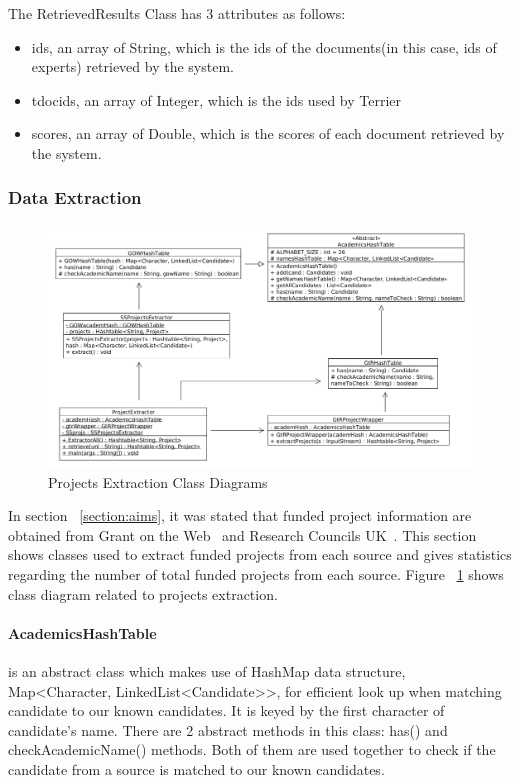 The RetrievedResults Class has 3 attributes as follows:
\begin{itemize}
 \item ids, an array of String, which is the ids of the documents(in this case, ids of experts) retrieved by the system.
 \item tdocids, an array of Integer, which is the ids used by Terrier
 \item scores, an array of Double, which is the scores of each document retrieved by the system.
\end{itemize}

\subsubsection{Data Extraction}
\begin{figure}
\centering
\includegraphics[scale=0.35]{./figures/projectsExtraction.png}
\caption{Projects Extraction Class Diagrams} \label{fig:projectsExtraction} 
\end{figure}
In section ~\ref{section:aims}, it was stated that funded project information are obtained from Grant on the Web~\cite{gow} and Research Councils UK~\cite{gtr}.
This section shows classes used to extract funded projects from each source and gives statistics regarding the number of total funded projects from each source.
Figure ~\ref{fig:projectsExtraction} shows class diagram related to projects extraction.
\paragraph{AcademicsHashTable} is an abstract class which makes use of HashMap data structure, Map<Character, LinkedList<Candidate>>, for efficient look up when matching candidate to our
known candidates. It is keyed by the first character of candidate's name. There are 2 abstract methods in this class: has() and checkAcademicName() methods.
Both of them are used together to check if the candidate from a source is matched to our known candidates.
